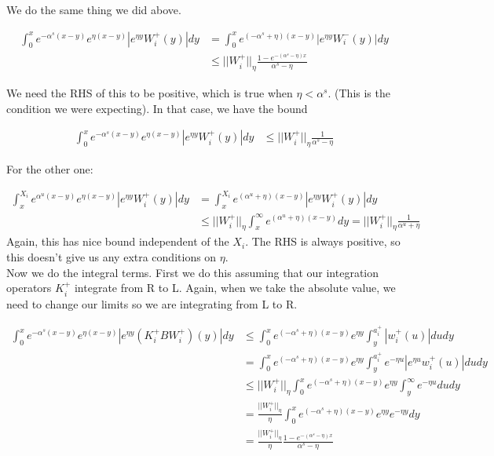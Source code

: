 \documentclass[12pt]{article}
\begin{document}
We do the same thing we did above.

\begin{align*}
\int_0^x e^{-\alpha^s (x-y)}e^{\eta(x-y)}|e^{\eta y} W_i^+(y)| dy &= \int_0^x e^{(-\alpha^s + \eta) (x-y)}|e^{\eta y} W_i^-(y)| dy \\
&\leq ||W_i^+||_\eta \frac{1 - e^{-(\alpha^s - \eta)x} }{\alpha^s - \eta}
\end{align*}

We need the RHS of this to be positive, which is true when $\eta < \alpha^s$. (This is the condition we were expecting). In that case, we have the bound

\begin{align*}
\int_0^x e^{-\alpha^s (x-y)}e^{\eta(x-y)}|e^{\eta y} W_i^+(y)| dy &\leq ||W_i^+||_\eta \frac{1}{\alpha^s - \eta}
\end{align*}

For the other one:

\begin{align*}
\int_x^{X_i} e^{\alpha^u (x-y)}e^{\eta(x-y)}|e^{\eta y} W_i^+(y)| dy &= \int_x^{X_i} e^{(\alpha^u + \eta) (x-y)}|e^{\eta y} W_i^+(y)| dy \\
&\leq ||W_i^+||_\eta \int_x^{\infty} e^{(\alpha^u + \eta) (x-y)} dy = ||W_i^+||_\eta \frac{1}{\alpha^u + \eta}
\end{align*}
Again, this has nice bound independent of the $X_i$. The RHS is always positive, so this doesn't give us any extra conditions on $\eta$. \\

Now we do the integral terms. First we do this assuming that our integration operators $K_i^+$ integrate from R to L. Again, when we take the absolute value, we need to change our limits so we are integrating from L to R.

\begin{align*}
\int_0^x e^{-\alpha^s (x-y)}e^{\eta(x-y)}|e^{\eta y} (K_i^+ B W_i^+)(y)| dy &\leq \int_0^x e^{(-\alpha^s + \eta)(x-y)}e^{\eta y} \int_y^{a_i^+} |w_i^+(u)| du dy \\
&= \int_0^x e^{(-\alpha^s + \eta)(x-y)}e^{\eta y} \int_y^{a_i^+} e^{-\eta u} |e^{\eta u} w_i^+(u)| du dy \\
&\leq ||W_i^+||_\eta \int_0^x e^{(-\alpha^s + \eta)(x-y)}e^{\eta y} \int_y^\infty e^{-\eta u} du dy \\
&= \frac{||W_i^+||_\eta}{\eta} \int_0^x e^{(-\alpha^s + \eta)(x-y)}e^{\eta y} e^{-\eta y} dy \\
&= \frac{||W_i^+||_\eta}{\eta} \frac{1 - e^{-(\alpha^s - \eta)x}}{\alpha^s - \eta} 
\end{align*}
\end{document}
